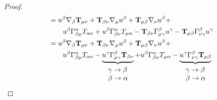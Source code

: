 \begin{proof}
\begin{equation}
\begin{aligned}
                                       & = u^\beta \v{\nabla}_\beta \T{T}_{\mu \nu}+\T{T}_{\beta \nu}\v{\nabla}_\mu u^\beta +\T{T}_{\mu \beta } \v{\nabla}_\nu u^\beta +  \\
         &\qquad u^\beta \Gamma_{\beta \mu}^\alpha T_{\alpha \nu} + u^\beta \Gamma_{\beta \nu}^\alpha T_{\mu \alpha}- \T{T}_{\beta \nu}\Gamma^\beta_{\mu \gamma} u^\gamma  -  \T{T}_{\mu \beta } \Gamma^\beta_{\nu \gamma} u^\gamma                                                                                                                                                                \\
                                       & = u^\beta \v{\nabla}_\beta \T{T}_{\mu \nu}+\T{T}_{\beta \nu}\v{\nabla}_\mu u^\beta +\T{T}_{\mu \beta } \v{\nabla}_\nu u^\beta +                                                                                        \\
        & \qquad u^\beta \Gamma_{\beta \mu}^\alpha T_{\alpha \nu}- \underbrace{u^\gamma\Gamma^\beta_{\mu \gamma}\T{T}_{\beta \nu}}_{\begin{array}{l}
                                                                                                                                    \gamma \rightarrow \beta \\
                                                                                                                                    \beta \rightarrow \alpha
                                                                                                                                \end{array}}  + u^\beta \Gamma_{\beta \nu}^\alpha T_{\mu \alpha}- \underbrace{u^\gamma \Gamma^\beta_{\nu \gamma}\T{T}_{\mu \beta }}_{\begin{array}{l}
                                                                                                                                                                                                                                                                         \gamma \rightarrow \beta \\
                                                                                                                                                                                                                                                                         \beta \rightarrow \alpha
                                                                                                                                                                                                                                                                     \end{array}}                                                                                                  \\

\end{aligned}
\end{equation}
\end{proof}
